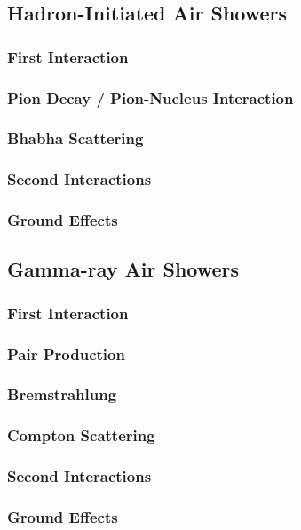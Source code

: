 \documentclass[12pt]{article}
\begin{document}
\subsection{Hadron-Initiated Air Showers}
\subsubsection{First Interaction}
\subsubsection{Pion Decay / Pion-Nucleus Interaction}
\subsubsection{Bhabha Scattering}
\subsubsection{Second Interactions}
\subsubsection{Ground Effects}


\subsection{Gamma-ray Air Showers}
\subsubsection{First Interaction}
\subsubsection{Pair Production}
\subsubsection{Bremstrahlung}
\subsubsection{Compton Scattering}
\subsubsection{Second Interactions}
\subsubsection{Ground Effects}
\end{document}
